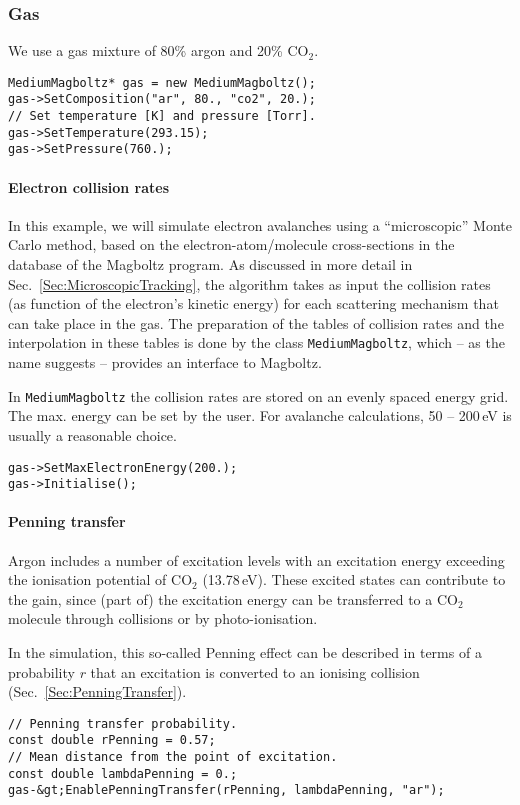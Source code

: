 \subsubsection{Gas}
We use a gas mixture of 80\% argon and 20\% CO\(_{2}\).
\begin{lstlisting}
MediumMagboltz* gas = new MediumMagboltz();
gas->SetComposition("ar", 80., "co2", 20.);
// Set temperature [K] and pressure [Torr].
gas->SetTemperature(293.15);
gas->SetPressure(760.);
\end{lstlisting}
\paragraph{Electron collision rates}
In this example, we will simulate electron avalanches using 
a ``microscopic'' Monte Carlo method,
based on the electron-atom/molecule cross-sections in the database of the 
Magboltz program. 
As discussed in more detail in Sec.~\ref{Sec:MicroscopicTracking},
the algorithm takes as input the collision rates (as function of the 
electron's kinetic energy) for each scattering mechanism 
that can take place in the gas.
The preparation of the tables of collision rates and the interpolation 
in these tables is done by the class \texttt{MediumMagboltz}, which -- as
the name suggests -- provides an interface to Magboltz.

In \texttt{MediumMagboltz} the collision rates are stored on an
evenly spaced energy grid. The max. energy can be set by the user.
For avalanche calculations, 50 -- 200\,eV is usually a reasonable choice.
\begin{lstlisting}
gas->SetMaxElectronEnergy(200.);
gas->Initialise();
\end{lstlisting}
\paragraph{Penning transfer}
Argon includes a number of excitation levels with an excitation energy
exceeding the ionisation potential of CO$_{2}$ (13.78\,eV).
These excited states can contribute to the gain,
since (part of) the excitation energy can be transferred
to a CO$_2$ molecule through collisions or by photo-ionisation.

In the simulation, this so-called Penning effect can be described 
in terms of a probability $r$ that an excitation is converted to an 
ionising collision (Sec.~\ref{Sec:PenningTransfer}).
\begin{lstlisting}
// Penning transfer probability.
const double rPenning = 0.57;
// Mean distance from the point of excitation.
const double lambdaPenning = 0.;
gas-&gt;EnablePenningTransfer(rPenning, lambdaPenning, "ar");
\end{lstlisting}
